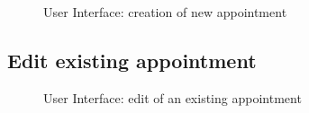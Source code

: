 \begin{figure}[!h]
	\centering
	\caption{User Interface: creation of new appointment}
\end{figure}
\clearpage

\subsection{Edit existing appointment}

\begin{figure}[!h]
	\centering
	\caption{User Interface: edit of an existing appointment}
\end{figure}
\clearpage

